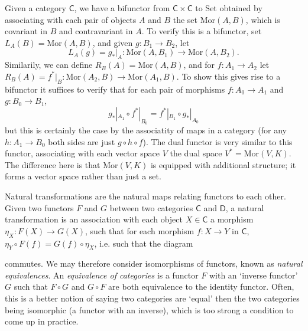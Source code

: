 \begin{example}
    Given a category $\mathsf{C}$, we have a bifunctor from $\mathsf{C} \times \mathsf{C}$ to {\sf Set} obtained by associating with each pair of objects $A$ and $B$ the set $\text{Mor}(A,B)$, which is covariant in $B$ and contravariant in $A$. To verify this is a bifunctor, set $L_A(B) = \text{Mor}(A,B)$, and given $g: B_1 \to B_2$, let
    \[ L_A(g) = g_*|_A: \text{Mor}(A,B_1) \to \text{Mor}(A,B_2). \]
    Similarily, we can define $R_B(A) = \text{Mor}(A,B)$, and for $f: A_1 \to A_2$ let $R_B(A) = f^*|_B : \text{Mor}(A_2,B) \to \text{Mor}(A_1,B)$. To show this gives rise to a bifunctor it suffices to verify that for each pair of morphisms $f: A_0 \to A_1$ and $g: B_0 \to B_1$,
    \[ g_*|_{A_1} \circ f^*|_{B_0} = f^*|_{B_1} \circ g_*|_{A_0} \]
    but this is certainly the case by the associatity of maps in a category (for any $h: A_1 \to B_0$ both sides are just $g \circ h \circ f$). The dual functor is very similar to this functor, associating with each vector space $V$ the dual space $V^* = \text{Mor}(V,K)$. The difference here is that $\text{Mor}(V,K)$ is equipped with additional structure; it forms a vector space rather than just a set.
\end{example}

Natural transformations are the natural maps relating functors to each other. Given two functors $F$ and $G$ between two categories $\mathsf{C}$ and $\mathsf{D}$, a natural transformation is an association with each object $X \in \mathsf{C}$ a morphism $\eta_X: F(X) \to G(X)$, such that for each morphism $f: X \to Y$ in $\mathsf{C}$, $\eta_Y \circ F(f) = G(f) \circ \eta_X$, i.e. such that the diagram
%
\begin{center}
\end{center}
%
commutes. We may therefore consider isomorphisms of functors, known as \emph{natural equivalences}. An \emph{equivalence of categories} is a functor $F$ with an `inverse functor' $G$ such that $F \circ G$ and $G \circ F$ are both equivalence to the identity functor. Often, this is a better notion of saying two categories are `equal' then the two categories being isomorphic (a functor with an inverse), which is too strong a condition to come up in practice.

